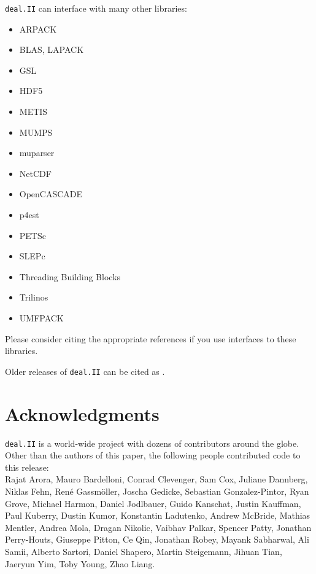 \documentclass{ansarticle-preprint}
\newcommand{\specialword}[1]{\texttt{#1}}
\newcommand{\dealii}{{\specialword{deal.II}}}
\begin{document}
\dealii{} can interface with many other libraries:
\begin{multicols}{2}
\begin{itemize}
\item ARPACK \cite{arpack}
\item BLAS, LAPACK
\item GSL \cite{gsl2016}
\item HDF5 \cite{hdf5}
\item METIS \cite{karypis1998fast}
\item MUMPS \cite{ADE00,MUMPS:1,MUMPS:2,mumps-web-page}
\item muparser \cite{muparser-web-page}
\item NetCDF \cite{rew1990netcdf}
\item OpenCASCADE \cite{opencascade-web-page}
\item p4est \cite{p4est}
\item PETSc \cite{petsc-user-ref,petsc-web-page}
\item SLEPc \cite{Hernandez:2005:SSF}
\item Threading Building Blocks \cite{Rei07}
\item Trilinos \cite{trilinos,trilinos-web-page}
\item UMFPACK \cite{umfpack}
\end{itemize}
\end{multicols}
Please consider citing the appropriate references if you use interfaces to these
libraries.

Older releases of \dealii{} can be cited as \cite{dealII80,dealII81,dealII82,dealII83,dealII84}.

\nocite{BangerthKanschat1999}

\section{Acknowledgments}

\dealii{} is a world-wide project with dozens of contributors around the
globe. Other than the authors of this paper, the following people contributed code to
this release:\\
%
%
Rajat  Arora,
Mauro  Bardelloni,
Conrad  Clevenger,
Sam  Cox,
Juliane  Dannberg,
Niklas Fehn,
Ren{\'e}  Gassm{\"o}ller,
Joscha  Gedicke,
Sebastian  Gonzalez-Pintor,
Ryan  Grove,
Michael  Harmon,
Daniel  Jodlbauer,
Guido  Kanschat,
Justin  Kauffman,
Paul  Kuberry,
Dustin  Kumor,
Konstantin  Ladutenko,
Andrew  McBride,
Mathias  Mentler,
Andrea  Mola,
Dragan  Nikolic,
Vaibhav  Palkar,
Spencer  Patty,
Jonathan  Perry-Houts,
Giuseppe  Pitton,
Ce  Qin,
Jonathan  Robey,
Mayank  Sabharwal,
Ali  Samii,
Alberto  Sartori,
Daniel  Shapero,
Martin  Steigemann,
Jihuan  Tian,
Jaeryun  Yim,
Toby  Young,
Zhao  Liang.
\end{document}
